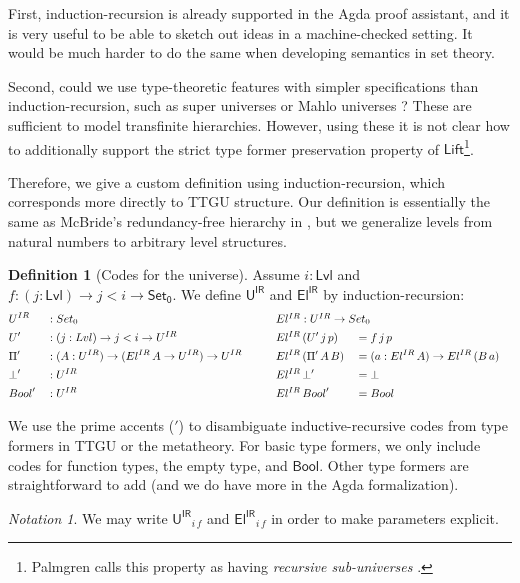 \documentclass[a4paper,UKenglish,cleveref, autoref, thm-restate]{lipics-v2021}
\theoremstyle{remark}
\newtheorem{notation}{Notation}
\theoremstyle{definition}
\newtheorem{mydefinition}{Definition}
\newcommand{\Set}[1]{\mathsf{Set_{#1}}}
\newcommand{\U}{\mathsf{U}}
\newcommand{\Bool}{\mathsf{Bool}}
\newcommand{\Lift}{\mathsf{Lift}}
\newcommand{\Lvl}{\mathsf{Lvl}}
\renewcommand{\U}{\mathsf{U}}
\newcommand{\msf}[1]{\mathsf{#1}}
\newcommand{\uir}{\msf{U^{IR}}}
\newcommand{\elir}{\msf{El^{IR}}}
\begin{document}
First, induction-recursion is already supported in the Agda proof assistant, and
it is very useful to be able to sketch out ideas in a machine-checked
setting. It would be much harder to do the same when developing semantics in set
theory.

Second, could we use type-theoretic features with simpler specifications than
induction-recursion, such as super universes \cite{Palmgren98onuniverses} or
Mahlo universes \cite{setzer00mahlo}? These are sufficient to model transfinite
hierarchies. However, using these it is not clear how to additionally support
the strict type former preservation property of $\Lift$\footnote{Palmgren calls
this property as having \emph{recursive sub-universes}
\cite{Palmgren98onuniverses}.}.

Therefore, we give a custom definition using induction-recursion, which
corresponds more directly to TTGU structure. Our definition is essentially the
same as McBride's redundancy-free hierarchy in
\cite[Section~6.3.1]{mcbride2015datatypes}, but we generalize levels from
natural numbers to arbitrary level structures.

\begin{mydefinition}[Codes for the universe]
Assume $i : \Lvl$ and $f : (j : \Lvl) \to j < i \to \Set0$. We define $\uir$ and
$\elir$ by induction-recursion:
\begin{alignat*}{5}
  & \uir   &&: \Set0
     && \rlap{$\elir : \uir \to \Set0$} \\
  & \U'    &&: (j : \Lvl) \to j < i \to \uir
     && \elir\,(\U'\,j\,p) &&= f\,j\,p \\
  & \Pi'   &&: (A : \uir) \to (\elir\,A \to \uir) \to \uir \hspace{2em}
     && \elir\,(\Pi'\,A\,B) &&= (a : \elir\,A) \to \elir\,(B\,a)\\
  & \bot' &&: \uir
     && \elir\,\bot'      &&= \bot\\
  & \Bool' &&: \uir
     && \elir\,\Bool'     &&= \Bool
\end{alignat*}
\end{mydefinition}
We use the prime accents ($'$) to disambiguate inductive-recursive codes from
type formers in TTGU or the metatheory. For basic type formers, we only include
codes for function types, the empty type, and $\Bool$. Other type formers are
straightforward to add (and we do have more in the Agda formalization).

\begin{notation}
We may write $\uir_{i\,f}$ and $\elir_{i\,f}$ in order to make parameters explicit.
\end{notation}
\end{document}
